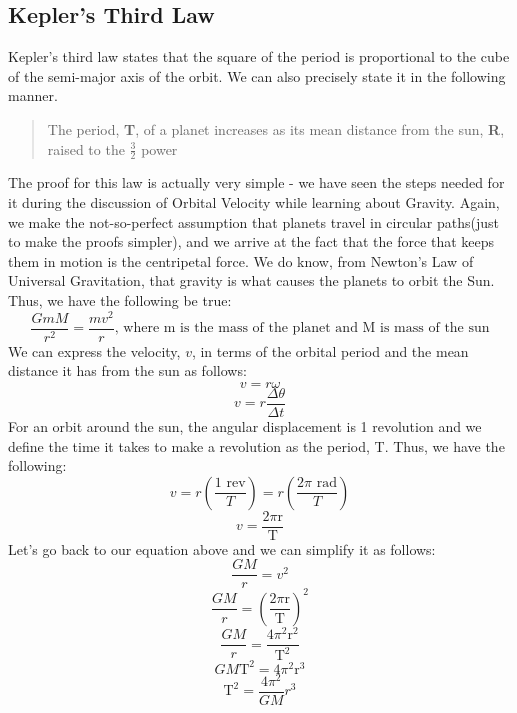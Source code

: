 \documentclass[9pt]{article}
\begin{document}
	\subsection*{Kepler's Third Law}
	Kepler’s third law states that the square of the period is proportional to the cube of the semi-major axis of the orbit. We can also precisely state it in the following manner. \begin{quotation}
		The period, \textbf{T}, of a planet increases as its mean distance from the sun, \textbf{R}, raised to the $\frac{3}{2}$ power
	\end{quotation}
	The proof for this law is actually very simple - we have seen the steps needed for it during the discussion of Orbital Velocity while learning about Gravity. Again, we make the not-so-perfect assumption that planets travel in circular paths(just to make the proofs simpler), and we arrive at the fact that the force that keeps them in motion is the centripetal force. We do know, from Newton's Law of Universal Gravitation, that gravity is what causes the planets to orbit the Sun. Thus, we have the following be true:
	$$\dfrac{GmM}{r^2}=\dfrac{mv^2}{r}\text{,    where m is the mass of the planet and M is mass of the sun}$$
	We can express the velocity, $v$, in terms of the orbital period and the mean distance it has from the sun as follows:
	$$v=r\omega$$
	$$v=r\dfrac{\varDelta\theta}{\varDelta t}$$ For an orbit around the sun, the angular displacement is 1 revolution and we define the time it takes to make a revolution as the period, T. Thus, we have the following:
	$$v=r(\dfrac{1 \text{ rev}}{T})=r(\dfrac{2\pi\text{ rad}}{T})$$
	$$v=\dfrac{2\pi\text{r}}{\text{T}}$$
	Let's go back to our equation above and we can simplify it as follows:
    $$\dfrac{GM}{r}=v^2$$
    $$\dfrac{GM}{r}=(\dfrac{2\pi\text{r}}{\text{T}})^2$$
    $$\dfrac{GM}{r}=\dfrac{4\pi^2\text{r}^2}{\text{T}^2}$$
    $$GM\text{T}^2=4\pi^2\text{r}^3$$
    $$\text{T}^2=\dfrac{4\pi^2}{GM}r^3$$
\end{document}
